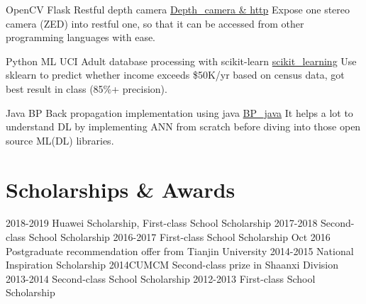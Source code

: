 \documentclass[utf8]{twentysecondcv} %
\begin{document}
\begin{twenty}
		\twentyitem
        {OpenCV}
        {Flask}
        {Restful depth camera}
        {\href{https://github.com/MiaoDX/depth\_camera}{Depth\_camera \& http}}
        {}
        {Expose one stereo camera (ZED) into restful one, so that it can be accessed from other programming languages with ease.}

	    \twentyitem
        {Python}
		{ML}
        {UCI Adult database processing with scikit-learn}
        {\href{https://github.com/MiaoDX/scikit\_learning/}{scikit\_learning}}
        {}
        {Use sklearn to predict whether income exceeds \$50K/yr based on census data, got best result in class (85\%+ precision).}
        
        \twentyitem
        {Java}
       	{BP}
        {Back propagation implementation using java}
        {\href{https://github.com/MiaoDX/bp_java}{BP\_java}}
        {}                
        {It helps a lot to understand DL by implementing ANN from scratch before diving into those open source ML(\/DL) libraries.}
		


\end{twenty}


\section{Scholarships \& Awards}

\begin{twentyshort}
    \twentyitemshort
        {2018-2019}
        {Huawei Scholarship, First-class School Scholarship}
    \twentyitemshort
        {2017-2018}
        {Second-class School Scholarship}
	\twentyitemshort
        {2016-2017}
        {First-class School Scholarship}
	\twentyitemshort
		{Oct 2016}        
		{Postgraduate recommendation offer from Tianjin University}
	\twentyitemshort
		{2014-2015}
		{National Inspiration Scholarship}
	\twentyitemshort
		{2014CUMCM}
		{Second-class prize in Shaanxi Division}
	\twentyitemshort
		{2013-2014}
		{Second-class School Scholarship}		
	\twentyitemshort
		{2012-2013}
		{First-class School Scholarship}		
\end{twentyshort}        
\end{document}

